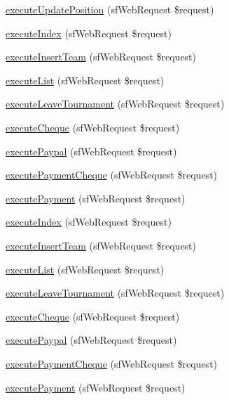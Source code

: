 \begin{DoxyCompactItemize}
\item 
\hyperlink{classtournament__slot_actions_acae2fa1cffde05d8c0331ca062d5ee54}{execute\-Update\-Position} (sf\-Web\-Request \$request)
\item 
\hyperlink{classtournament__slot_actions_a948cc911eb1d9f77990be54af3b2080f}{execute\-Index} (sf\-Web\-Request \$request)
\item 
\hyperlink{classtournament__slot_actions_af3455c2e330cdd20bd04779bef74870e}{execute\-Insert\-Team} (sf\-Web\-Request \$request)
\item 
\hyperlink{classtournament__slot_actions_a0a9783a06d648bc57d630465f8efa38a}{execute\-List} (sf\-Web\-Request \$request)
\item 
\hyperlink{classtournament__slot_actions_a3e64f95d2968389c974309cb8a99f253}{execute\-Leave\-Tournament} (sf\-Web\-Request \$request)
\item 
\hyperlink{classtournament__slot_actions_a1f7d07b6470940e2d9da9fe55484dba7}{execute\-Cheque} (sf\-Web\-Request \$request)
\item 
\hyperlink{classtournament__slot_actions_abf0e7767ab894a0bb811d2c4d3d56281}{execute\-Paypal} (sf\-Web\-Request \$request)
\item 
\hyperlink{classtournament__slot_actions_aaa0a73387cf3bf3a11f087e7bb3eeda3}{execute\-Payment\-Cheque} (sf\-Web\-Request \$request)
\item 
\hyperlink{classtournament__slot_actions_ac01f511718bdcd3761f579d50198fb58}{execute\-Payment} (sf\-Web\-Request \$request)
\item 
\hyperlink{classtournament__slot_actions_a948cc911eb1d9f77990be54af3b2080f}{execute\-Index} (sf\-Web\-Request \$request)
\item 
\hyperlink{classtournament__slot_actions_af3455c2e330cdd20bd04779bef74870e}{execute\-Insert\-Team} (sf\-Web\-Request \$request)
\item 
\hyperlink{classtournament__slot_actions_a0a9783a06d648bc57d630465f8efa38a}{execute\-List} (sf\-Web\-Request \$request)
\item 
\hyperlink{classtournament__slot_actions_a3e64f95d2968389c974309cb8a99f253}{execute\-Leave\-Tournament} (sf\-Web\-Request \$request)
\item 
\hyperlink{classtournament__slot_actions_a1f7d07b6470940e2d9da9fe55484dba7}{execute\-Cheque} (sf\-Web\-Request \$request)
\item 
\hyperlink{classtournament__slot_actions_abf0e7767ab894a0bb811d2c4d3d56281}{execute\-Paypal} (sf\-Web\-Request \$request)
\item 
\hyperlink{classtournament__slot_actions_aaa0a73387cf3bf3a11f087e7bb3eeda3}{execute\-Payment\-Cheque} (sf\-Web\-Request \$request)
\item 
\hyperlink{classtournament__slot_actions_ac01f511718bdcd3761f579d50198fb58}{execute\-Payment} (sf\-Web\-Request \$request)
\end{DoxyCompactItemize}
